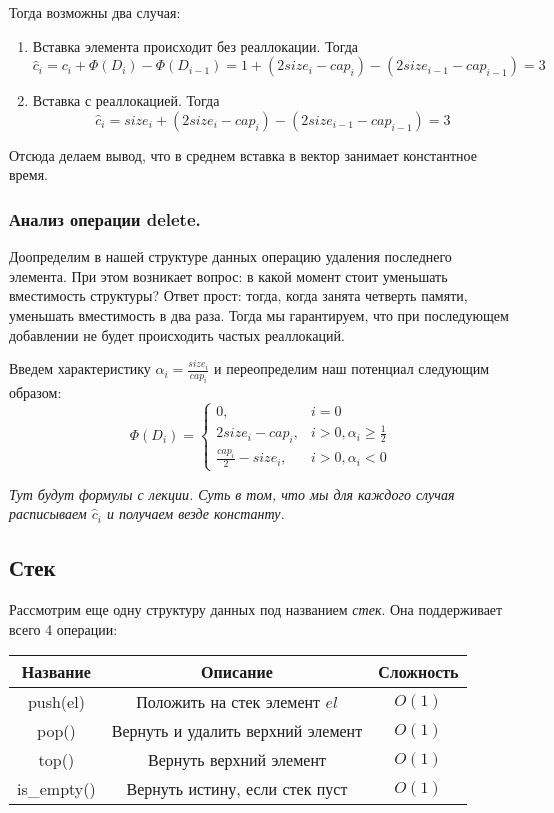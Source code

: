 \documentclass[../main.tex]{subfiles}
\begin{document}
	Тогда возможны два случая: 
	\begin{enumerate}
		\item Вставка элемента происходит без реаллокации. Тогда
		\[
		\hat c_i 
		=
		c_i + \Phi(D_i) - \Phi(D_{i - 1})
		=
		1 + (2size_i - cap_i) - (2size_{i - 1} - cap_{i - 1})
		=
		3
		\]
		\item Вставка с реаллокацией. Тогда 
		\[
		\hat c_i
		=
		size_i + (2size_i - cap_i) - (2size_{i - 1} - cap_{i - 1}) %
		=3
		\]
	\end{enumerate}
	
	Отсюда делаем вывод, что в среднем вставка в вектор занимает константное время.
	
	\subsubsection{Анализ операции delete.}
	
	Доопределим в нашей структуре данных операцию удаления последнего элемента. При этом возникает вопрос: в какой момент стоит уменьшать вместимость структуры? Ответ прост: тогда, когда занята четверть памяти, уменьшать вместимость в два раза. Тогда мы гарантируем, что при последующем добавлении не будет происходить частых реаллокаций.
	
	Введем характеристику $\alpha_i = \frac{size_i}{cap_i}$ и переопределим наш потенциал следующим образом:
	\[
	\Phi(D_i) = 
	\begin{cases}
		0, & i = 0 \\
		2size_i - cap_i, & i > 0, \alpha_i \geqslant \frac12 \\
		\frac{cap_i}{2} - size_i, & i > 0, \alpha_i < 0
	\end{cases}
	\]
	
	
	\textit{Тут будут формулы с лекции. Суть в том, что мы для каждого случая расписываем $\hat c_i$ и получаем везде константу.}
	
	\subsection{Стек}
	
	Рассмотрим еще одну структуру данных под названием \textit{стек}. Она поддерживает всего 4 операции:
	
	\begin{center}
		\begin{tabular}{c|c|c}
			Название & Описание & Сложность \\ \hline
			push(el) & Положить на стек элемент $el$ & $ O(1) $ \\ \hline
			pop() & Вернуть и удалить верхний элемент & $ O(1) $ \\ \hline
			top() & Вернуть верхний элемент & $ O(1) $ \\ \hline
			is\_empty() & Вернуть истину, если стек пуст & $ O(1) $	
		\end{tabular}
	\end{center}
	
\end{document}

